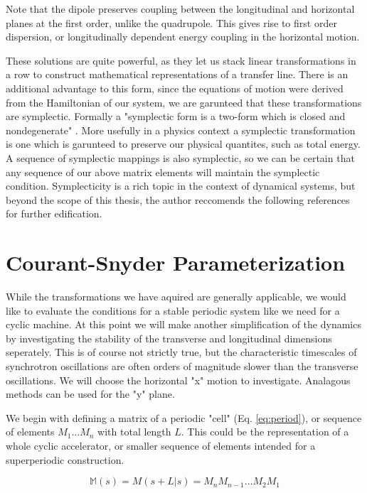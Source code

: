 Note that the dipole preserves coupling between the longitudinal and horizontal planes at the first order, unlike the quadrupole. This gives rise to first order dispersion, or longitudinally dependent energy coupling in the horizontal motion. 

These solutions are quite powerful, as they let us stack linear transformations in a row to construct mathematical representations of a transfer line. There is an additional advantage to this form, since the equations of motion were derived from the Hamiltonian of our system, we are garunteed that these transformations are symplectic. Formally a "symplectic form is a two-form which is closed and nondegenerate" \cite{JoseAndSalatan}. More usefully in a physics context a symplectic transformation is one which is garunteed to preserve our physical quantites, such as total energy. A sequence of symplectic mappings is also symplectic, so we can be certain that any sequence of our above matrix elements will maintain the symplectic condition. Symplecticity is a rich topic in the context of dynamical systems, but beyond the scope of this thesis, the author reccomends the following references for further edification.

\section{Courant-Snyder Parameterization} \label{sec:CSparam}
While the transformations we have aquired are generally applicable, we would like to evaluate the conditions for a stable periodic system like we need for a cyclic machine. At this point we will make another simplification of the dynamics by investigating the stability of the transverse and longitudinal dimensions seperately. This is of course not strictly true, but the characteristic timescales of synchrotron oscillations are often orders of magnitude slower than the transverse oscillations. We will choose the horizontal "x" motion to investigate. Analagous methods can be used for the "y" plane.

We begin with defining a matrix of a periodic "cell" (Eq. \ref{eq:period}), or sequence of elements $M_1 \dots M_n$ with total length $L$. This could be the representation of a whole cyclic accelerator, or smaller sequence of elements intended for a superperiodic construction.

\begin{equation} \label{eq:period}
	\mathbb{M}(s) = M(s+L|s) = M_nM_{n-1}\dots M_2M_1
\end{equation}

